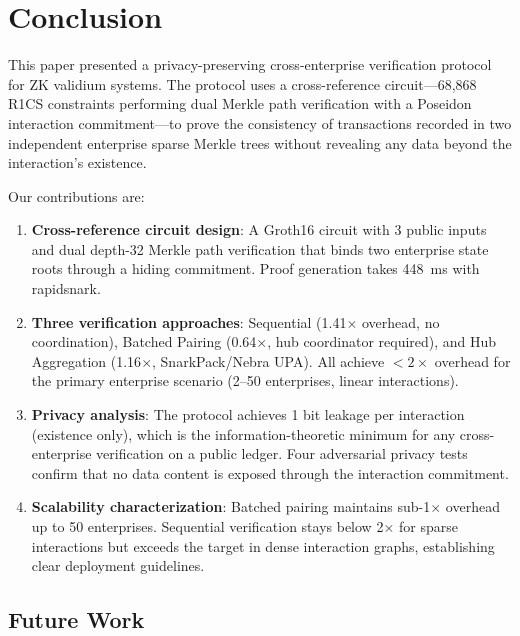 
\section{Conclusion}

This paper presented a privacy-preserving cross-enterprise verification
protocol for ZK validium systems. The protocol uses a cross-reference
circuit---68,868 R1CS constraints performing dual Merkle path verification
with a Poseidon interaction commitment---to prove the consistency of
transactions recorded in two independent enterprise sparse Merkle trees
without revealing any data beyond the interaction's existence.

Our contributions are:

\begin{enumerate}
\item \textbf{Cross-reference circuit design}: A Groth16 circuit with 3
  public inputs and dual depth-32 Merkle path verification that binds
  two enterprise state roots through a hiding commitment. Proof generation
  takes 448~ms with rapidsnark.

\item \textbf{Three verification approaches}: Sequential (1.41$\times$
  overhead, no coordination), Batched Pairing (0.64$\times$, hub
  coordinator required), and Hub Aggregation (1.16$\times$, SnarkPack/Nebra
  UPA). All achieve $< 2\times$ overhead for the primary enterprise
  scenario (2--50 enterprises, linear interactions).

\item \textbf{Privacy analysis}: The protocol achieves 1 bit leakage per
  interaction (existence only), which is the information-theoretic minimum
  for any cross-enterprise verification on a public ledger. Four
  adversarial privacy tests confirm that no data content is exposed through
  the interaction commitment.

\item \textbf{Scalability characterization}: Batched pairing maintains
  sub-1$\times$ overhead up to 50 enterprises. Sequential verification
  stays below 2$\times$ for sparse interactions but exceeds the target in
  dense interaction graphs, establishing clear deployment guidelines.
\end{enumerate}

\subsection{Future Work}

